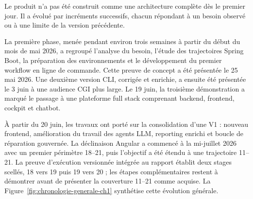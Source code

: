 Le produit n'a pas été construit comme une architecture complète dès le premier jour. Il a évolué par incréments successifs, chacun répondant à un besoin observé ou à une limite de la version précédente.

La première phase, menée pendant environ trois semaines à partir du début du mois de mai 2026, a regroupé l'analyse du besoin, l'étude des trajectoires Spring Boot, la préparation des environnements et le développement du premier workflow en ligne de commande. Cette preuve de concept a été présentée le 25 mai 2026. Une deuxième version CLI, corrigée et enrichie, a ensuite été présentée le 3 juin à une audience CGI plus large. Le 19 juin, la troisième démonstration a marqué le passage à une plateforme full stack comprenant backend, frontend, cockpit et chatbot.

À partir du 20 juin, les travaux ont porté sur la consolidation d'une V1 : nouveau frontend, amélioration du travail des agents LLM, reporting enrichi et boucle de réparation gouvernée. La déclinaison Angular a commencé à la mi-juillet 2026 avec un premier périmètre 18--21, puis l'objectif a été étendu à une trajectoire 11--21. La preuve d'exécution versionnée intégrée au rapport établit deux stages scellés, 18 vers 19 puis 19 vers 20 ; les étapes complémentaires restent à démontrer avant de présenter la couverture 11--21 comme acquise. La Figure~\ref{fig:chronologie-generale-ch1} synthétise cette évolution générale.

